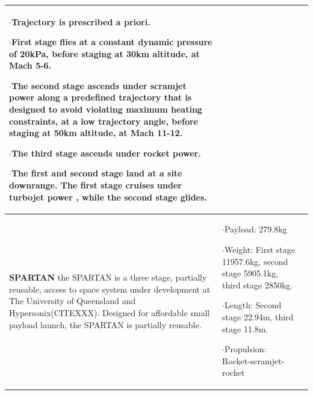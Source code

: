 {\begin{landscape}
\begin{xltabular}{\linewidth}{|X|X|X|}
	$\cdot$Trajectory is prescribed a priori.
	
	$\cdot$First stage flies at a constant dynamic pressure of 20kPa, before staging at 30km altitude, at Mach 5-6.
	
	$\cdot$The second stage ascends under scramjet power along a predefined trajectory that is designed to avoid violating maximum heating constraints, at a low trajectory angle, before staging at 50km altitude, at Mach 11-12.
	
	$\cdot$The third stage ascends under rocket power. 
	
	$\cdot$The first and second stage land at a site downrange. The first stage cruises under turbojet power , while the second stage glides. 
	

	\\
	\hline \small
	\textbf{SPARTAN}\cite{Preller2018a} \newline\newline
	the SPARTAN is a three stage, partially reusable, access to space system under development at The University of Queensland\cite{Jazra2013,Preller2018a} and Hypersonix(CITEXXX). Designed for affordable small payload launch, the SPARTAN is partially reusable. 
	&\small
	
	$\cdot$Payload: 279.8kg
	
	$\cdot$Weight: First stage 11957.6kg, second stage 5905.1kg, third stage 2850kg.
	
	$\cdot$Length: Second stage 22.94m, third stage 11.8m. 
	
	$\cdot$Propulsion: Rocket-scramjet-rocket
	
	
	&\small
	

\end{xltabular}
\end{landscape}}
